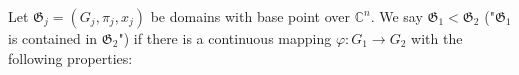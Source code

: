 Let $\mathfrak{G}_j = (G_j, \pi_j, x_j)$ be domains with base point over $\mathbb{C}^n$. We say $\mathfrak{G}_1 < \mathfrak{G}_2$ ("$\mathfrak{G}_1$ is contained in $\mathfrak{G}_2$") if there is a continuous mapping $\varphi: G_1 \rightarrow G_2$ with the following properties:
